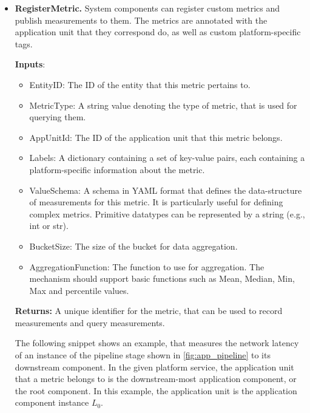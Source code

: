 \begin{itemize}
\item \textbf{RegisterMetric.} System components can register custom metrics and publish measurements to them. The metrics are annotated with the application unit that they correspond do, as well as custom platform-specific tags. 
\par \noindent \textbf{Inputs}:
\begin{itemize}
\item EntityID: The ID of the entity that this metric pertains to.
\item MetricType: A string value denoting the type of metric, that is used for querying them.
\item AppUnitId: The ID of the application unit that this metric belongs.
\item Labels: A dictionary containing a set of key-value pairs, each containing a platform-specific information about the metric.
\item ValueSchema: A schema in YAML format that defines the data-structure of measurements for this metric. It is particularly useful for defining complex metrics. Primitive datatypes can be represented by a string (e.g., int or str).
\item BucketSize: The size of the bucket for data aggregation.
\item AggregationFunction: The function to use for aggregation. The mechanism should support basic functions such as Mean, Median, Min, Max and percentile values.
\end{itemize}
\par \noindent \textbf{Returns: } A unique identifier for the metric, that can be used to record measurements and query measurements.
\par The following snippet shows an example, that measures the network latency of an instance of the pipeline stage shown in \cref{fig:app_pipeline} to its downstream component. In the given platform service, the application unit that a metric belongs to is the downstream-most application component, or the root component. In this example, the application unit is the application component instance $L_0$. 

\end{itemize}
